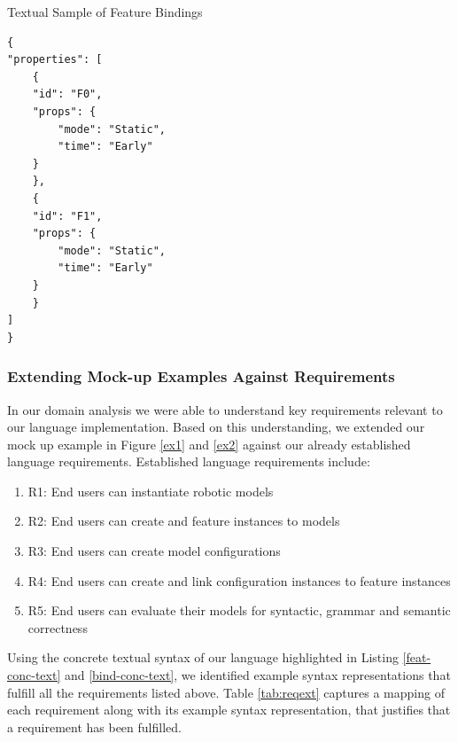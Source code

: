 \documentclass[conference]{IEEEtran}
\begin{document}
\begin{listing}
\caption{Textual Sample of Feature Bindings}
\begin{verbatim}
{
"properties": [
    {
    "id": "F0",
    "props": {
        "mode": "Static",
        "time": "Early"
    }
    },
    {
    "id": "F1",
    "props": {
        "mode": "Static",
        "time": "Early"
    }
    }
]
}
\end{verbatim}
\label{bind-conc-text}
\end{listing}

\subsubsection{Extending Mock-up Examples Against Requirements}
In our domain analysis we were able to understand key requirements relevant to our language implementation. Based on this understanding, we extended our mock up example in Figure \ref{ex1} and \ref{ex2} against our already established language requirements. Established language requirements include:
\begin{enumerate}
    \item R1: End users can instantiate robotic models
    \item R2: End users can create and feature instances to models
    \item R3: End users can create model configurations
    \item R4: End users can create and link configuration instances to feature instances
    \item R5: End users can evaluate their models for syntactic, grammar and semantic correctness
\end{enumerate}
Using the concrete textual syntax of our language highlighted in Listing \ref{feat-conc-text} and \ref{bind-conc-text}, we identified example syntax representations that fulfill all the requirements listed above. Table \ref{tab:reqext} captures a mapping of each requirement along with its example syntax representation, that justifies that a requirement has been fulfilled.
\end{document}
